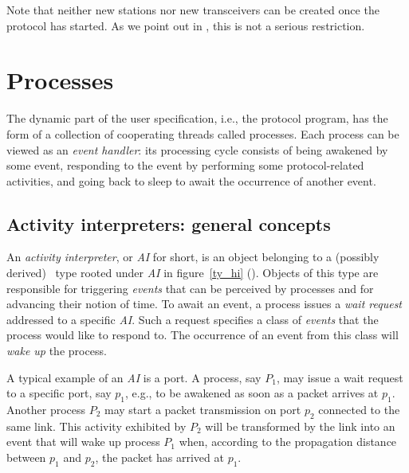 Note that neither new stations nor new transceivers can be created once the
protocol has started.
As we point out in , this is not a serious restriction.
\section{Processes}
\label{rm_pr}

The dynamic part of the user specification, i.e., the protocol program,
has the form of a collection of cooperating threads called processes.
Each process can be viewed as an {\em event handler\/}:
its processing cycle consists of being
awakened by some event, responding to the event
by performing some protocol-related activities,
and going back to sleep to await the occurrence of another event.

\subsection{Activity interpreters: general concepts}
\label{rm_pr_ai}

An {\em activity interpreter}, or {\em AI\/} for short, is an object
belonging to a (possibly derived) \smurph\ type rooted under {\em AI\/}
in figure~\ref{ty_hi} ().
Objects of this type are responsible for triggering {\em events\/} that can
be perceived by processes and for advancing their notion of time.
To await an event, a process issues a
{\em wait request\/} addressed to a specific {\em AI}.
Such a request specifies a class of {\em events\/}
that the process would like to respond to.
The occurrence of an event from this class will {\em wake up\/} the process.

A typical example of an {\em AI\/} is a port.
A process, say $P_1$, may issue a wait request to a specific port,
say $p_1$, e.g.,
to be awakened as soon as a packet arrives at $p_1$.
Another process $P_2$ may start a packet transmission on port $p_2$
connected to the same link.
This activity exhibited by $P_2$ will be transformed by the link into an
event that will wake up process $P_1$ when, according to the propagation
distance between $p_1$ and $p_2$, the packet has arrived at $p_1$.

